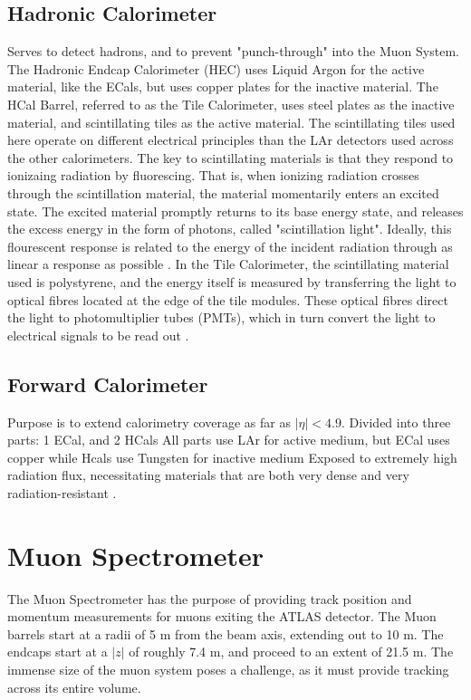     \subsection{Hadronic Calorimeter}
        Serves to detect hadrons, and to prevent "punch-through" into the Muon System.
        The Hadronic Endcap Calorimeter (HEC) uses Liquid Argon for the active material, like the ECals, but uses copper plates for the inactive material.
        The HCal Barrel, referred to as the Tile Calorimeter, uses steel plates as the inactive material, and scintillating tiles as the active material.
        The scintillating tiles used here operate on different electrical principles than the LAr detectors used across the other calorimeters.
        The key to scintillating materials is that they respond to ionizaing radiation by fluorescing.
        That is, when ionizing radiation crosses through the scintillation material, the material momentarily enters an excited state.
        The excited material promptly returns to its base energy state, and releases the excess energy in the form of photons, called "scintillation light".
        Ideally, this flourescent response is related to the energy of the incident radiation through as linear a response as possible \cite{wiley_radiation_detection}.
        In the Tile Calorimeter, the scintillating material used is polystyrene, and the energy itself is measured by transferring the light to optical fibres located at the edge of the tile modules.
        These optical fibres direct the light to photomultiplier tubes (PMTs), which in turn convert the light to electrical signals to be read out \cite{tcal_tdr}.


    \subsection{Forward Calorimeter}
        Purpose is to extend calorimetry coverage as far as $|\eta| < 4.9$.
        Divided into three parts: 1 ECal, and 2 HCals
        All parts use LAr for active medium, but ECal uses copper while Hcals use Tungsten for inactive medium
        Exposed to extremely high radiation flux, necessitating materials that are both very dense and very radiation-resistant \cite{Lar_cal_tdr}.

    



\section{Muon Spectrometer} \label{sec:muon}
    The Muon Spectrometer has the purpose of providing track position and momentum measurements for muons exiting the ATLAS detector.
    The Muon barrels start at a radii of 5 m from the beam axis, extending out to 10 m.
    The endcaps start at a $|z|$ of roughly 7.4 m, and proceed to an extent of 21.5 m.
    The immense size of the muon system poses a challenge, as it must provide tracking across its entire volume.

